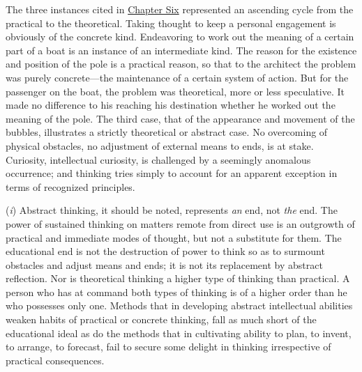 \documentclass[showtrims,ustradepaper]{memoir}
\begin{document}
The three instances cited in
\protect\hyperlink{ux40publicux40vhostux40gux40gutenbergux40htmlux40filesux4037423ux4037423-hux4037423-h-2.htm.htmlux5cux23CHAPTER_SIX}{Chapter
Six} represented an ascending cycle from the practical to the
theoretical. Taking thought to keep a personal engagement is obviously
of the concrete kind. Endeavoring to work out the meaning of a certain
part of a boat is an instance of an intermediate kind. The reason for
the existence and position of the pole is a practical reason, so that to
the architect the problem was purely concrete---the maintenance of a
certain system of action. But for the passenger on the boat, the problem
was theoretical, more or less speculative. It made no difference to his
reaching his destination whether he worked out the meaning of the pole.
The third case, that of the appearance and movement of the bubbles,
illustrates a strictly theoretical or abstract case. No overcoming of
physical obstacles, no adjustment of external means to ends, is at
stake. Curiosity, intellectual curiosity, is challenged by a seemingly
anomalous occurrence; and thinking tries simply to account for an
apparent exception in terms of recognized principles.


(\emph{i}) Abstract thinking, it should be noted, represents \emph{an}
end, not \emph{the} end. The power of sustained thinking on matters
remote from direct use is an outgrowth of practical and immediate modes
of thought, but not a substitute for them. The educational end is not
the destruction of power to think so as to surmount obstacles and adjust
means and ends; it is not its replacement by abstract reflection. Nor is
theoretical thinking a higher type of thinking than practical. A person
who has at command both types of thinking is of a higher order than he
who possesses only one. Methods that in
developing
abstract intellectual abilities weaken habits of practical or concrete
thinking, fall as much short of the educational ideal as do the methods
that in cultivating ability to plan, to invent, to arrange, to forecast,
fail to secure some delight in thinking irrespective of practical
consequences.

\end{document}

